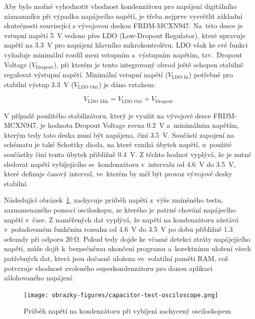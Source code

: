 \newpage

Aby bylo možné vyhodnotit vhodnost kondenzátoru pro napájení digitálního záznamníku při výpadku napájecího napětí, je třeba nejprve vysvětlit základní skutečnosti související s vývojovou deskou FRDM-MCXN947. Na~této desce je vstupní napětí \SI{5}{\volt} vedeno přes LDO (Low-Dropout Regulator), které upravuje napětí na \SI{3.3}{\volt} pro napájení hlavního mikrokontroléru. LDO však ke své funkci vyžaduje minimální rozdíl mezi vstupním a~výstupním napětím, tzv.~Dropout Voltage ($V_{\text{Dropout}}$), při kterém je tento integrovaný obvod ještě schopen stabilně regulovat výstupní napětí. Minimální vstupní napětí ($V_{\text{LDO In}}$) potřebné pro stabilní výstup \SI{3.3}{\volt} ($V_{\text{LDO Out}}$) je dáno vztahem:

\[
V_{\text{LDO Min}} = V_{\text{LDO Out}} + V_{\text{Dropout}}
\]

V případě použitého stabilizátoru, který je využit na vývojové desce FRDM-MCXN947, je hodnota Dropout Voltage rovna \SI{0.2}{\volt} a~minimálním napětím, kterým tedy tato deska musí být napájena, činí \SI{3.5}{\volt}. Součástí zapojení na schématu je také Schottky dioda, na které vzniká úbytek napětí, u~použité součástky činí tento úbytek přibližně \SI{0.4}{\volt}. Z těchto hodnot vyplývá, že je nutné sledovat napětí vybíjejícího se~kondenzátoru v~intervalu od \SI{4.6}{\volt} do \SI{3.5}{\volt}, které definuje časový interval, ve~kterém by měl být provoz vývojové desky stabilní.

Následující obrázek~\ref{fig:test-capacitors-osciloscope}, zachycuje průběh napětí z~výše zmíněného testu, zaznamenaného pomocí osciloskopu, ze kterého je patrné chování napájecího napětí v~čase. Z naměřených dat vyplývá, že napětí na kondenzátoru zůstává v~požadovaném funkčním rozsahu od \SI{4.6}{\volt} do \SI{3.5}{\volt} po dobu přibližně 1.3 sekundy při odporu $\SI{20}{\ohm}$. Pokud tedy dojde ke včasné detekci ztráty napájejícího napětí, může dojít k~bezpečnému ukončení programu a~korektnímu uložení všech potřebných dat, která jsou dočasně uložena ve~volatilní paměti RAM, což potvrzuje vhodnost zvoleného superkondenzátoru pro danou aplikaci zálohovaného napájení.

\begin{figure}[h]
    \centering
    \texttt{[image: obrazky-figures/capacitor-test-osciloscope.png]}
    
    \caption{Průběh napětí na kondenzátoru při vybíjení zachycený osciloskopem}
    \label{fig:test-capacitors-osciloscope}
\end{figure}


